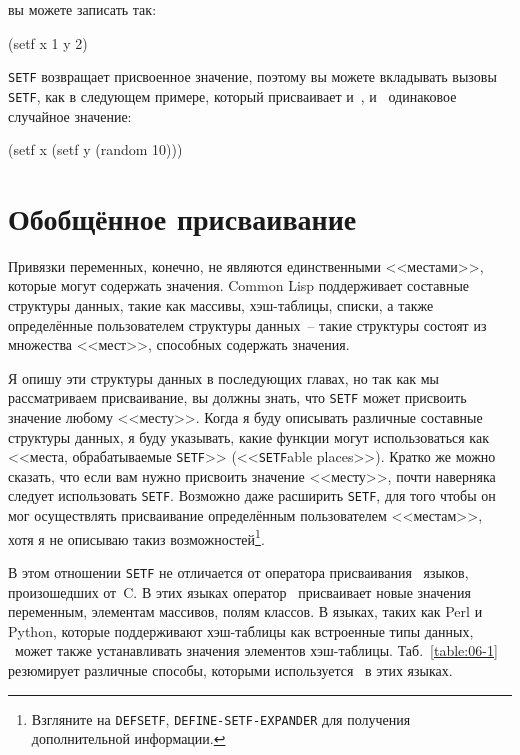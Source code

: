 \noindent{}вы можете записать так:

\begin{myverb}
  (setf x 1 y 2)
\end{myverb}

\lstinline{SETF} возвращает присвоенное значение, поэтому вы можете вкладывать вызовы
\lstinline{SETF}, как в следующем примере, который присваивает и~, и~ одинаковое случайное
значение:

\begin{myverb}
  (setf x (setf y (random 10)))
\end{myverb}

\section{Обобщённое присваивание}

Привязки переменных, конечно, не являются единственными <<местами>>, которые могут содержать
значения. Common Lisp поддерживает составные структуры данных, такие как массивы,
хэш-таблицы, списки, а также определённые пользователем структуры данных~-- такие
структуры состоят из множества <<мест>>, способных содержать значения.

Я опишу эти структуры данных в последующих главах, но так как мы рассматриваем
присваивание, вы должны знать, что \lstinline{SETF} может присвоить значение любому
<<месту>>. Когда я буду описывать различные составные структуры данных, я буду указывать,
какие функции могут использоваться как <<места, обрабатываемые \lstinline{SETF}>>
(<<\lstinline{SETF}able places>>). Кратко же можно сказать, что если вам нужно присвоить
значение <<месту>>, почти наверняка следует использовать \lstinline{SETF}. Возможно даже
расширить \lstinline{SETF}, для того чтобы он мог осуществлять присваивание определённым
пользователем <<местам>>, хотя я не описываю такиз возможностей\footnote{Взгляните на
  \lstinline{DEFSETF}, \lstinline{DEFINE-SETF-EXPANDER} для получения дополнительной
  информации.}.

В этом отношении \lstinline{SETF} не отличается от оператора присваивания~\code{=} языков,
произошедших от~C. В этих языках оператор~\code{=} присваивает новые значения переменным,
элементам массивов, полям классов. В языках, таких как Perl и Python, которые поддерживают
хэш-таблицы как встроенные типы данных, \code{=}~может также устанавливать значения
элементов хэш-таблицы. Таб.~\ref{table:06-1} резюмирует различные способы, которыми
используется~\code{=} в этих языках.

